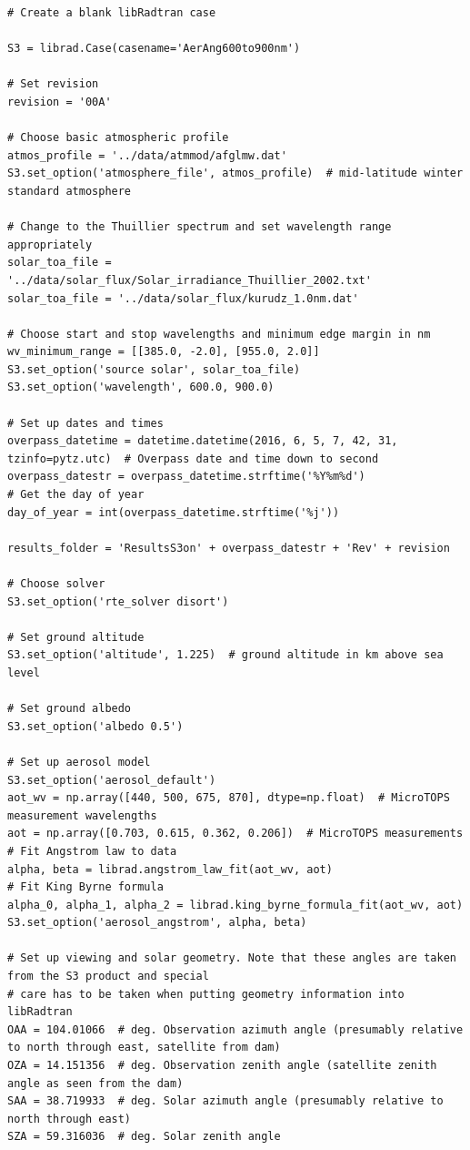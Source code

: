 \begin{lstlisting}[style=tinysize]
# Create a blank libRadtran case

S3 = librad.Case(casename='AerAng600to900nm')

# Set revision
revision = '00A'

# Choose basic atmospheric profile
atmos_profile = '../data/atmmod/afglmw.dat'
S3.set_option('atmosphere_file', atmos_profile)  # mid-latitude winter standard atmosphere

# Change to the Thuillier spectrum and set wavelength range appropriately
solar_toa_file = '../data/solar_flux/Solar_irradiance_Thuillier_2002.txt'
solar_toa_file = '../data/solar_flux/kurudz_1.0nm.dat'

# Choose start and stop wavelengths and minimum edge margin in nm
wv_minimum_range = [[385.0, -2.0], [955.0, 2.0]]
S3.set_option('source solar', solar_toa_file)
S3.set_option('wavelength', 600.0, 900.0)

# Set up dates and times
overpass_datetime = datetime.datetime(2016, 6, 5, 7, 42, 31, tzinfo=pytz.utc)  # Overpass date and time down to second
overpass_datestr = overpass_datetime.strftime('%Y%m%d')
# Get the day of year
day_of_year = int(overpass_datetime.strftime('%j'))

results_folder = 'ResultsS3on' + overpass_datestr + 'Rev' + revision

# Choose solver
S3.set_option('rte_solver disort')

# Set ground altitude
S3.set_option('altitude', 1.225)  # ground altitude in km above sea level

# Set ground albedo
S3.set_option('albedo 0.5')

# Set up aerosol model
S3.set_option('aerosol_default')
aot_wv = np.array([440, 500, 675, 870], dtype=np.float)  # MicroTOPS measurement wavelengths
aot = np.array([0.703, 0.615, 0.362, 0.206])  # MicroTOPS measurements
# Fit Angstrom law to data
alpha, beta = librad.angstrom_law_fit(aot_wv, aot)
# Fit King Byrne formula
alpha_0, alpha_1, alpha_2 = librad.king_byrne_formula_fit(aot_wv, aot)
S3.set_option('aerosol_angstrom', alpha, beta)

# Set up viewing and solar geometry. Note that these angles are taken from the S3 product and special
# care has to be taken when putting geometry information into libRadtran
OAA = 104.01066  # deg. Observation azimuth angle (presumably relative to north through east, satellite from dam)
OZA = 14.151356  # deg. Observation zenith angle (satellite zenith angle as seen from the dam)
SAA = 38.719933  # deg. Solar azimuth angle (presumably relative to north through east)
SZA = 59.316036  # deg. Solar zenith angle


\end{lstlisting}
